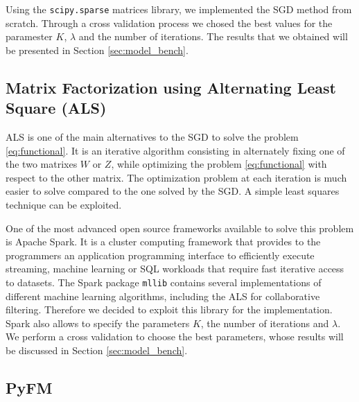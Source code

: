\documentclass[10pt,conference,compsocconf]{IEEEtran}
\begin{document}
Using the \texttt{scipy.sparse} matrices library, we implemented the SGD method from scratch.
Through a cross validation process we chosed the best values for the paramester $K$, $\lambda$ and
the number of iterations. The results that we obtained will be presented in Section
\ref{sec:model_bench}.

\subsection{Matrix Factorization using Alternating Least Square (ALS)}
ALS is one of the main alternatives to the SGD to solve the problem \ref{eq:functional}.
It is an iterative algorithm consisting in alternately fixing one of the two matrixes $W$ or $Z$,
while optimizing the problem \ref{eq:functional} with respect to the other matrix.
The optimization problem at each iteration is much easier to solve compared to the one solved by the
SGD. A simple least squares technique can be exploited.

One of the most advanced open source frameworks available to solve this problem is Apache Spark. It
is a cluster computing framework that provides to the programmers an application programming
interface to efficiently execute streaming, machine learning or SQL workloads that require fast
iterative access to datasets.
The Spark package \texttt{mllib} contains several implementations of different machine learning
algorithms, including the ALS for collaborative filtering. Therefore we decided to exploit this
library for the implementation.
Spark also allows to specify the parameters $K$, the number of iterations and $\lambda$. We perform a
cross validation to choose the best parameters, whose results will be discussed in Section 
\ref{sec:model_bench}.

\subsection{PyFM}

\end{document}
